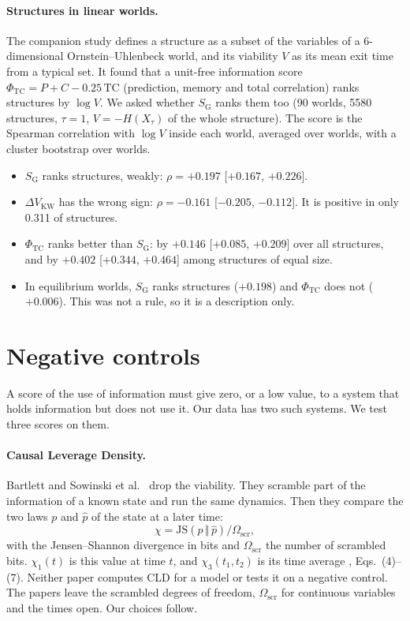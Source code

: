 \documentclass[11pt]{article}
\newcommand{\SG}{S_{\mathrm{G}}}
\newcommand{\DVKW}{\Delta V_{\mathrm{KW}}}
\newcommand{\JS}{\mathrm{JS}}
\newcommand{\Oscr}{\Omega_{\mathrm{scr}}}
\newcommand{\PhiTC}{\Phi_{\mathrm{TC}}}
\newcommand{\TC}{\mathrm{TC}}
\begin{document}
\paragraph{Structures in linear worlds.} The companion study \cite{Beiro26} defines a structure as a subset of the
variables of a 6-dimensional Ornstein--Uhlenbeck world, and its viability $V$ as its mean exit time from a typical set.
It found that a unit-free information score $\PhiTC=P+C-0.25\,\TC$ (prediction, memory and total correlation) ranks
structures by $\log V$. We asked whether $\SG$ ranks them too (90 worlds, 5580 structures, $\tau=1$, $V=-H(X_\tau)$ of
the whole structure). The score is the Spearman correlation with $\log V$ inside each world, averaged over worlds, with
a cluster bootstrap over worlds.
\begin{itemize}
\item $\SG$ ranks structures, weakly: $\rho=+0.197$ [$+0.167$, $+0.226$].
\item $\DVKW$ has the wrong sign: $\rho=-0.161$ [$-0.205$, $-0.112$]. It is positive in only 0.311 of structures.
\item $\PhiTC$ ranks better than $\SG$: by $+0.146$ [$+0.085$, $+0.209$] over all structures, and by $+0.402$
[$+0.344$, $+0.464$] among structures of equal size.
\item In equilibrium worlds, $\SG$ ranks structures ($+0.198$) and $\PhiTC$ does not ($+0.006$). This was not a rule,
so it is a description only.
\end{itemize}

\section{Negative controls}
\label{sec:controls}
A score of the use of information must give zero, or a low value, to a system that holds information but does not use
it. Our data has two such systems. We test three scores on them.

\paragraph{Causal Leverage Density.} Bartlett \cite{Bartlett24} and Sowinski et al.\ \cite{SowinskiEtAl25} drop the
viability. They scramble part of the information of a known state and run the same dynamics. Then they compare the two laws
$p$ and $\hat p$ of the state at a later time:
\begin{equation}
  \chi = \JS(p\,\Vert\,\hat p)/\Oscr ,
\end{equation}
with the Jensen--Shannon divergence in bits and $\Oscr$ the number of scrambled bits. $\chi_1(t)$ is this value at time
$t$, and $\chi_3(t_1,t_2)$ is its time average \cite{SowinskiEtAl25}, Eqs.~(4)--(7). Neither paper computes CLD for a
model or tests it on a negative control. The papers leave the scrambled degrees of freedom, $\Oscr$ for continuous
variables and the times open. Our choices follow.
\end{document}
